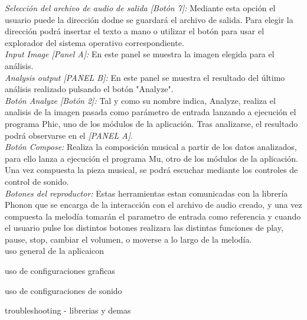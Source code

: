 		\noindent\textit{Selección del archivo de audio de salida [Botón 7]:}  Mediante esta opción el usuario puede la dirección dodne se guardará el archivo de salida. Para elegir la dirección podrá insertar el texto a mano o utilizar el botón para usar el explorador del sistema operativo correspondiente.\\
		
		\noindent\textit{Input Image [Panel A]:} En este panel se muestra la imagen elegida para el análisis.\\
		
		\noindent\textit{Analysis output [PANEL B]:} En este panel se muestra el resultado del último análisis realizado pulsando el botón "Analyze".\\
		
		\noindent\textit{Botón Analyze [Botón 2]:} Tal y como su nombre indica, Analyze, realiza el analisis de la imagen pasada como parámetro de entrada lanzando a ejecución el programa Phic, uno de los módulos de la aplicación. Tras analizarse, el resultado podrá observarse en el \textit{[PANEL A]}.\\
		
		\noindent\textit{Botón Compose:} Realiza la composición musical a partir de los datos analizados, para ello lanza a ejecución el programa Mu, otro de los módulos de la aplicación. Una vez compuesta la pieza musical, se podrá escuchar mediante los controles de control de sonido.\\
		
		\textit{Botones del reproductor:} Estas herramientas estan comunicadas con la librería Phonon que se encarga de la interacción con el archivo de audio creado, y una vez compuesta la melodía tomarán el parametro de entrada como referencia y cuando el usuario pulse los distintos botones realizara las distintas funciones de play, pause, stop, cambiar el volumen, o moverse a lo largo de la melodía.\\


   uso general de la aplicaicon

   uso de configuraciones graficas

   uso de configuraciones de sonido

   

          troubleshooting - librerias y demas
		  
